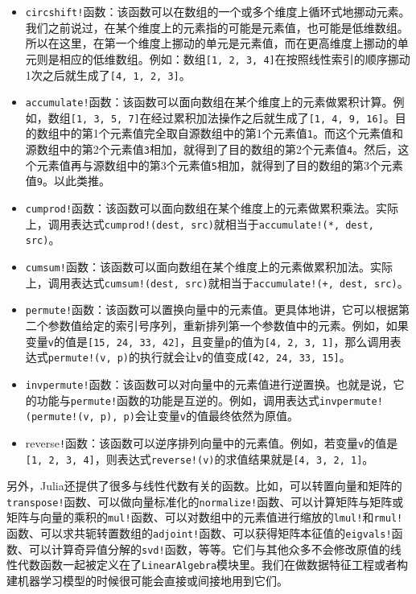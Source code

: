 \begin{itemize}
\item \verb|circshift!|函数：该函数可以在数组的一个或多个维度上循环式地挪动元素。我们之前说过，在某个维度上的元素指的可能是元素值，也可能是低维数组。所以在这里，在第一个维度上挪动的单元是元素值，而在更高维度上挪动的单元则是相应的低维数组。例如：数组\verb|[1, 2, 3, 4]|在按照线性索引的顺序挪动1次之后就生成了\verb|[4, 1, 2, 3]|。
\item \verb|accumulate!|函数：该函数可以面向数组在某个维度上的元素做累积计算。例如，数组\verb|[1, 3, 5, 7]|在经过累积加法操作之后就生成了\verb|[1, 4, 9, 16]|。目的数组中的第1个元素值完全取自源数组中的第1个元素值\verb|1|。而这个元素值和源数组中的第2个元素值\verb|3|相加，就得到了目的数组的第2个元素值\verb|4|。然后，这个元素值再与源数组中的第3个元素值\verb|5|相加，就得到了目的数组的第3个元素值\verb|9|。以此类推。
\item  \verb|cumprod!|函数：该函数可以面向数组在某个维度上的元素做累积乘法。实际上，调用表达式\verb|cumprod!(dest, src)|就相当于\verb|accumulate!(*, dest, src)|。
\item \verb|cumsum!|函数：该函数可以面向数组在某个维度上的元素做累积加法。实际上，调用表达式\verb|cumsum!(dest, src)|就相当于\verb|accumulate!(+, dest, src)|。
\item \verb|permute!|函数：该函数可以置换向量中的元素值。更具体地讲，它可以根据第二个参数值给定的索引号序列，重新排列第一个参数值中的元素。例如，如果变量\verb|v|的值是\verb|[15, 24, 33, 42]|，且变量\verb|p|的值为\verb|[4, 2, 3, 1]|，那么调用表达式\verb|permute!(v, p)|的执行就会让\verb|v|的值变成\verb|[42, 24, 33, 15]|。
\item \verb|invpermute!|函数：该函数可以对向量中的元素值进行逆置换。也就是说，它的功能与\verb|permute!|函数的功能是互逆的。例如，调用表达式\verb|invpermute!(permute!(v, p), p)|会让变量\verb|v|的值最终依然为原值。
\item reverse\verb|!|函数：该函数可以逆序排列向量中的元素值。例如，若变量\verb|v|的值是\verb|[1, 2, 3, 4]|，则表达式\verb|reverse!(v)|的求值结果就是\verb|[4, 3, 2, 1]|。
\end{itemize}

另外，Julia还提供了很多与线性代数有关的函数。比如，可以转置向量和矩阵的\verb|transpose!|函数、可以做向量标准化的\verb|normalize!|函数、可以计算矩阵与矩阵或矩阵与向量的乘积的\verb|mul!|函数、可以对数组中的元素值进行缩放的\verb|lmul!|和\verb|rmul!|函数、可以求共轭转置数组的\verb|adjoint!|函数、可以获得矩阵本征值的\verb|eigvals!|函数、可以计算奇异值分解的\verb|svd!|函数，等等。它们与其他众多不会修改原值的线性代数函数一起被定义在了\verb|LinearAlgebra|模块里。我们在做数据特征工程或者构建机器学习模型的时候很可能会直接或间接地用到它们。
